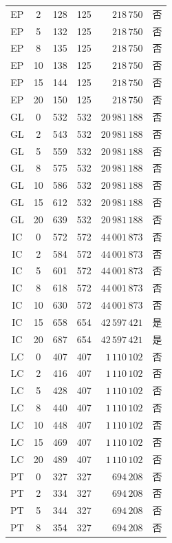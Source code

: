 \documentclass[UTF8,a4paper,twoside,zihao=-4]{ctexart}
\numberwithin{equation}{section}
\numberwithin{figure}{section}
\numberwithin{table}{section}
\theoremstyle{definition}
\numberwithin{algocf}{section}
\begin{document}
{\begin{longtable}{@{}ccrrrc@{}}
EP & 2  & 128 & 125 & $218\,750$    & 否 \\
EP & 5  & 132 & 125 & $218\,750$    & 否 \\
EP & 8  & 135 & 125 & $218\,750$    & 否 \\
EP & 10 & 138 & 125 & $218\,750$    & 否 \\
EP & 15 & 144 & 125 & $218\,750$    & 否 \\
EP & 20 & 150 & 125 & $218\,750$    & 否 \\
\addlinespace
GL & 0  & 532 & 532 & $20\,981\,188$ & 否 \\
GL & 2  & 543 & 532 & $20\,981\,188$ & 否 \\
GL & 5  & 559 & 532 & $20\,981\,188$ & 否 \\
GL & 8  & 575 & 532 & $20\,981\,188$ & 否 \\
GL & 10 & 586 & 532 & $20\,981\,188$ & 否 \\
GL & 15 & 612 & 532 & $20\,981\,188$ & 否 \\
GL & 20 & 639 & 532 & $20\,981\,188$ & 否 \\
\addlinespace
IC & 0  & 572 & 572 & $44\,001\,873$ & 否 \\
IC & 2  & 584 & 572 & $44\,001\,873$ & 否 \\
IC & 5  & 601 & 572 & $44\,001\,873$ & 否 \\
IC & 8  & 618 & 572 & $44\,001\,873$ & 否 \\
IC & 10 & 630 & 572 & $44\,001\,873$ & 否 \\
IC & 15 & 658 & 654 & $42\,597\,421$ & 是 \\
IC & 20 & 687 & 654 & $42\,597\,421$ & 是 \\
\addlinespace
LC & 0  & 407 & 407 & $1\,110\,102$  & 否 \\
LC & 2  & 416 & 407 & $1\,110\,102$  & 否 \\
LC & 5  & 428 & 407 & $1\,110\,102$  & 否 \\
LC & 8  & 440 & 407 & $1\,110\,102$  & 否 \\
LC & 10 & 448 & 407 & $1\,110\,102$  & 否 \\
LC & 15 & 469 & 407 & $1\,110\,102$  & 否 \\
LC & 20 & 489 & 407 & $1\,110\,102$  & 否 \\
\addlinespace
PT & 0  & 327 & 327 & $694\,208$    & 否 \\
PT & 2  & 334 & 327 & $694\,208$    & 否 \\
PT & 5  & 344 & 327 & $694\,208$    & 否 \\
PT & 8  & 354 & 327 & $694\,208$    & 否 \\

\end{longtable}}
\end{document}
